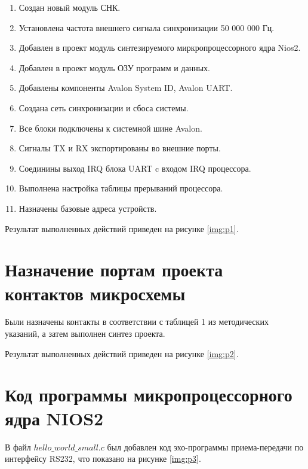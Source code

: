 \begin{enumerate}
	\item Создан новый модуль СНК.	
	\item Установлена частота внешнего сигнала синхронизации 50 000 000 Гц.
	\item Добавлен в проект модуль  синтезируемого миркропроцессорного ядра Nios2.
	\item Добавлен в проект модуль ОЗУ программ и данных.
	\item Добавлены компоненты Avalon System ID, Avalon UART.
	\item Создана сеть синхронизации и сбоса системы.
	\item Все блоки подключены к системной шине Avalon.
	\item Сигналы TX и RX экспортированы во внешние порты.
	\item Соединины выход IRQ блока UART c входом IRQ процессора.
	\item Выполнена настройка таблицы прерываний процессора.
	\item Назначены базовые адреса устройств.
\end{enumerate}

Результат выполненных действий приведен на рисунке \ref{img:p1}.

\clearpage

\section*{Назначение портам проекта контактов микросхемы} 

Были назначены контакты в соответствии с таблицей 1 из методических указаний, а затем выполнен синтез проекта.

\clearpage

Результат выполненных действий приведен на рисунке \ref{img:p2}.

\clearpage

\section*{Код программы микропроцессорного ядра NIOS2}


В файл  $hello\_world\_small.c$ был добавлен код эхо-программы приема-передачи по интерфейсу RS232, что показано на рисунке \ref{img:p3}.

\clearpage

